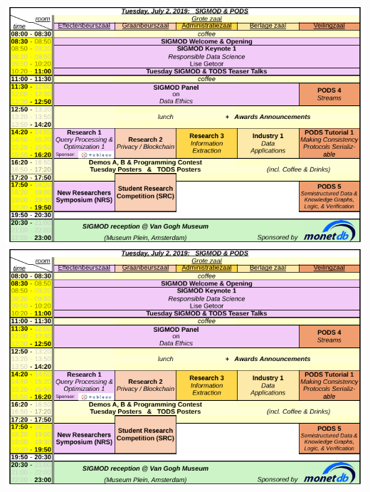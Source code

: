 \ifodd\value{page}
\includegraphics[angle=90,width=\textwidth]{schedule/p3.pdf}%
\else
\includegraphics[angle=270,width=\textwidth]{schedule/p3.pdf}%
\fi

\newpage

